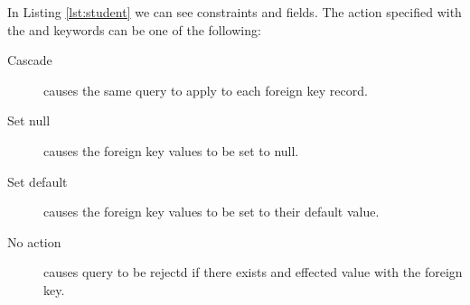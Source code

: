 \documentclass[11pt,a4paper,twocolumn]{book}
\begin{document}
In Listing \ref{lst:student} we can see constraints and fields. The action specified with the  and  keywords can be one of the following:

\begin{description}
\item[Cascade] causes the same query to apply to each foreign key record.
\item[Set null] causes the foreign key values to be set to null.
\item[Set default] causes the foreign key values to be set to their default value.
\item[No action] causes query to be rejectd if there exists and effected value with the foreign key.
\end{description}
\end{document}
